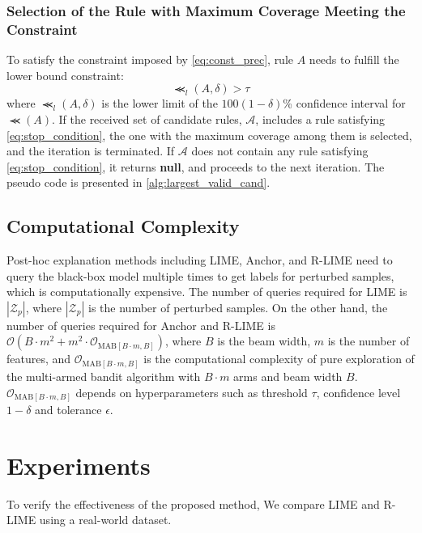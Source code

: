 \documentclass[11pt]{article}
\begin{document}
\subsubsection{Selection of the Rule with Maximum Coverage Meeting the Constraint}
To satisfy the constraint imposed by \cref{eq:const_prec}, rule $A$ needs to fulfill the lower bound constraint:
\begin{equation}
	\Prec_{l}(A,\delta)>\tau
	\label{eq:stop_condition}
\end{equation}
where $\Prec_{l}(A,\delta)$ is the lower limit of
the $100(1-\delta)$\% confidence interval for $\Prec(A)$.
If the received set of candidate rules, $\mathcal{A}$,
includes a rule satisfying \cref{eq:stop_condition},
the one with the maximum coverage among them is selected,
and the iteration is terminated.
If $\mathcal{A}$ does not contain any rule satisfying \cref{eq:stop_condition},
it returns \textbf{null},
and proceeds to the next iteration.
The pseudo code is presented in \cref{alg:largest_valid_cand}.


\subsection{Computational Complexity}
Post-hoc explanation methods including LIME, Anchor, and R-LIME
need to query the black-box model multiple times
to get labels for perturbed samples, which is computationally expensive.
The number of queries required for LIME is $|\mathcal{Z}_p|$,
where $|\mathcal{Z}_p|$ is the number of perturbed samples.
On the other hand,
the number of queries required for Anchor and R-LIME is
$\mathcal{O}(B\cdot m^2+m^2\cdot\mathcal{O}_{\mathrm{MAB}[B\cdot m,B]})$,
where $B$ is the beam width, $m$ is the number of features, and
$\mathcal{O}_{\mathrm{MAB}[B\cdot m,B]}$ is the computational complexity of
pure exploration
of the multi-armed bandit algorithm with $B\cdot m$ arms and beam width $B$.
$\mathcal{O}_{\mathrm{MAB}[B\cdot m,B]}$ depends on hyperparameters
such as threshold $\tau$, confidence level $1-\delta$ and tolerance $\epsilon$.

\section{Experiments}
To verify the effectiveness of the proposed method,
We compare LIME and R-LIME using a real-world dataset.
\end{document}
